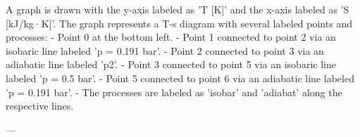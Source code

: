A graph is drawn with the y-axis labeled as 'T [K]' and the x-axis labeled as 'S [kJ/kg·K]'. The graph represents a T-s diagram with several labeled points and processes:  
- Point 0 at the bottom left.  
- Point 1 connected to point 2 via an isobaric line labeled 'p = 0.191 bar'.  
- Point 2 connected to point 3 via an adiabatic line labeled 'p2'.  
- Point 3 connected to point 5 via an isobaric line labeled 'p = 0.5 bar'.  
- Point 5 connected to point 6 via an adiabatic line labeled 'p = 0.191 bar'.  
- The processes are labeled as 'isobar' and 'adiabat' along the respective lines.  

---